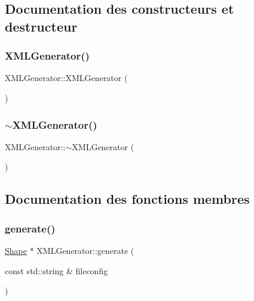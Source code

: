 \subsection{Documentation des constructeurs et destructeur}
\mbox{\label{class_x_m_l_generator_ae88722c986a3d984f0050be10d69e6aa}} 
\subsubsection{\texorpdfstring{X\+M\+L\+Generator()}{XMLGenerator()}}
{\footnotesize\ttfamily X\+M\+L\+Generator\+::\+X\+M\+L\+Generator (\begin{DoxyParamCaption}{ }\end{DoxyParamCaption})}

\mbox{\label{class_x_m_l_generator_a8f947bac9f682ba5a22ccb98ff88ff81}} 
\subsubsection{\texorpdfstring{$\sim$\+X\+M\+L\+Generator()}{~XMLGenerator()}}
{\footnotesize\ttfamily X\+M\+L\+Generator\+::$\sim$\+X\+M\+L\+Generator (\begin{DoxyParamCaption}{ }\end{DoxyParamCaption})}



\subsection{Documentation des fonctions membres}
\mbox{\label{class_x_m_l_generator_adf874b492da2e813980151c3453dd75c}} 
\subsubsection{\texorpdfstring{generate()}{generate()}}
{\footnotesize\ttfamily \hyperlink{class_shape}{Shape} $\ast$ X\+M\+L\+Generator\+::generate (\begin{DoxyParamCaption}\item[{const std\+::string \&}]{fileconfig }\end{DoxyParamCaption})\hspace{0.3cm}{\ttfamily [virtual]}}


